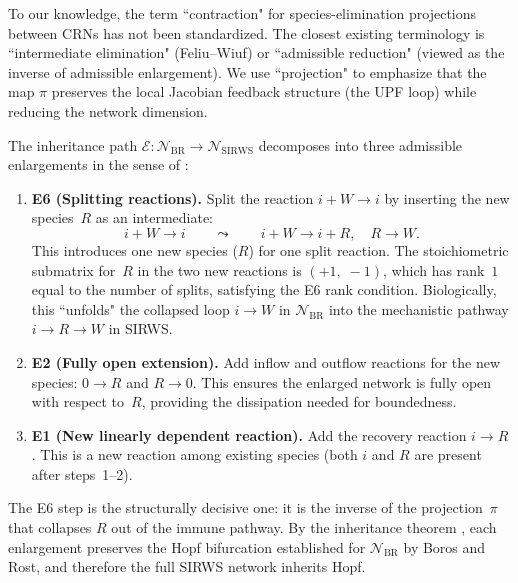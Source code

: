 \begin{remark}
To our knowledge, the term ``contraction" for species-elimination
projections between CRNs has not been standardized.
The closest existing terminology is ``intermediate elimination"
(Feliu--Wiuf) or ``admissible reduction" (viewed as the inverse of
admissible enlargement).
We use ``projection" to emphasize that the map $\pi$ preserves the
local Jacobian feedback structure (the UPF loop) while reducing the
network dimension.
\end{remark}

\begin{remark}\label{rem:enlargements}
The inheritance path $\mathcal{E}\colon \mathcal{N}_{\mathrm{BR}} \to
\mathcal{N}_{\mathrm{SIRWS}}$ decomposes into three admissible enlargements
in the sense of \cite{BBH25}:

\begin{enumerate}[nosep]
\item \textbf{E6 (Splitting reactions).}
  Split the reaction $i+W \to i$ by inserting the new species~$R$
  as an intermediate:
  \[
    i + W \to i \qquad\leadsto\qquad
    i + W \to i + R,\quad R \to W.
  \]
  This introduces one new species ($R$) for one split reaction.
  The stoichiometric submatrix for~$R$ in the two new reactions is
  $(+1,\;-1)$, which has rank~$1$ equal to the number of splits,
  satisfying the E6 rank condition.
  Biologically, this ``unfolds" the collapsed loop
  $i \to W$ in $\mathcal{N}_{\mathrm{BR}}$ into the mechanistic
  pathway $i \to R \to W$ in SIRWS.

\item \textbf{E2 (Fully open extension).}
  Add inflow and outflow reactions for the new species:
  $0 \to R$ and $R \to 0$.
  This ensures the enlarged network is fully open with respect to~$R$,
  providing the dissipation needed for boundedness.

\item \textbf{E1 (New linearly dependent reaction).}
  Add the recovery reaction $i \to R$.
  This is a new reaction among existing species
  (both $i$ and $R$ are present after steps~1--2).
\end{enumerate}

The E6 step is the structurally decisive one: it is the inverse of the
projection~$\pi$ that collapses $R$ out of the immune pathway.
By the inheritance theorem \cite{BBH25}, each enlargement preserves the
Hopf bifurcation established for $\mathcal{N}_{\mathrm{BR}}$ by
Boros and Rost, and therefore the full SIRWS network inherits Hopf.
\end{remark}

